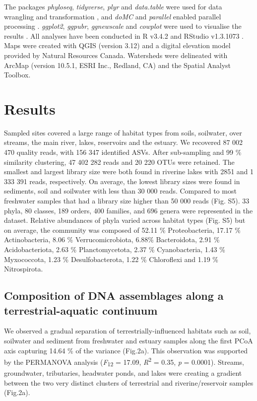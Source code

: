 \documentclass[12pt,a4paper]{article} %
\begin{document}
The packages \textit{phyloseq}, \textit{tidyverse}, \textit{plyr} and \textit{data.table} were used for data wrangling and transformation \citep{McMurdie2013,Wickham2019, Wickham2011, Dowle2019}, and \textit{doMC} and \textit{parallel} enabled parallel processing \citep{Analytics2019, RCoreTeam2017}. \textit{ggplot2}, \textit{ggpubr}, \textit{ggnewscale} and \textit{cowplot} were used to visualise the results \citep{Wickham2016, Kassambara2018, Campitelli2020, Wilke2019}. All analyses have been conducted in R v3.4.2 \citep{RCoreTeam2017} and RStudio v1.3.1073 \citep{RStudioTeam2016}. Maps were created with QGIS (version 3.12) and a digital elevation model provided by Natural Resources Canada. Watersheds were delineated with ArcMap (version 10.5.1, ESRI Inc., Redland, CA) and the Spatial Analyst Toolbox.

\section*{Results}
Sampled sites covered a large range of habitat types from soils, soilwater, over streams, the main river, lakes, reservoirs and the estuary. We recovered 87 002 470 quality reads, with 156 347 identified ASVs. After sub-sampling and 99 \% similarity clustering, 47 402 282 reads and 20 220 OTUs were retained. The smallest and largest library size were both found in riverine lakes with 2851 and 1 333 391 reads, respectively. On average, the lowest library sizes were found in sediments, soil and soilwater with less than 30 000 reads. Compared to most freshwater samples that had a library size higher than 50 000 reads (Fig. S5). 33 phyla, 80 classes,  189 orders, 400 families, and 696 genera were represented in the dataset. Relative abundances of phyla varied across habitat types (Fig. S5) but on average, the community was composed of 52.11 \% Proteobacteria, 17.17 \% Actinobacteria, 8.06 \% Verrucomicrobiota, 6.88\% Bacteroidota, 2.91 \% Acidobacteriota, 2.63 \% Planctomycetota, 2.37 \% Cyanobacteria, 1.43 \% Myxococcota, 1.23 \% Desulfobacterota, 1.22 \% Chloroflexi and 1.19 \% Nitrospirota.

\subsection*{Composition of DNA assemblages along a terrestrial-aquatic continuum}
We observed a gradual separation of terrestrially-influenced habitats such as soil, soilwater and sediment from freshwater and estuary samples along the first PCoA axis capturing 14.64 \% of the variance (Fig.2a). This observation was supported by the PERMANOVA analysis (\textit{F}\textsubscript{12} = 17.09, \textit{R}\textsuperscript{2} = 0.35, \textit{p} = 0.0001). Streams, groundwater, tributaries, headwater ponds, and lakes were creating a gradient between the two very distinct clusters of terrestrial and riverine/reservoir samples (Fig.2a).
\end{document}
